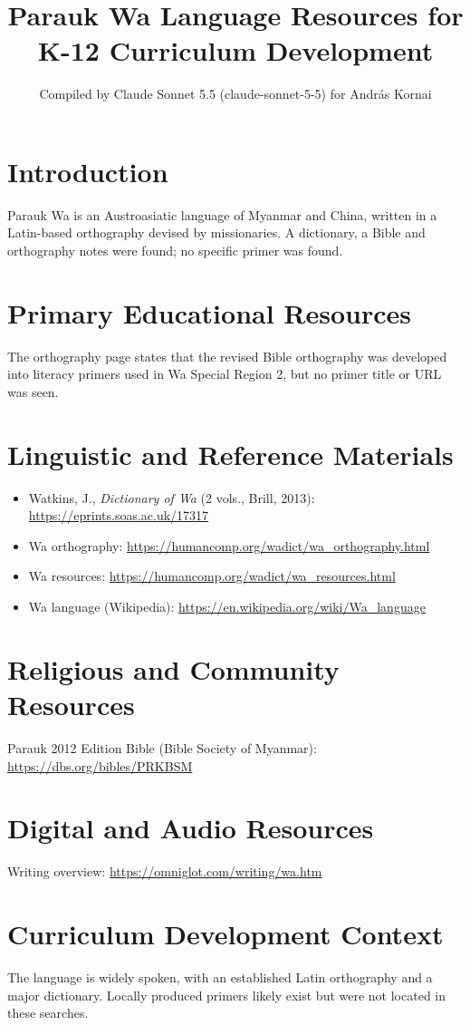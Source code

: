 \documentclass[12pt]{article}
\title{Parauk Wa Language Resources for K-12 Curriculum Development}
\author{Compiled by Claude Sonnet 5.5 (claude-sonnet-5-5) for Andr\'as Kornai}
\date{}
\begin{document}
\maketitle
\section{Introduction}
Parauk Wa is an Austroasiatic language of Myanmar and China, written in a Latin-based orthography devised by missionaries. A dictionary, a Bible and orthography notes were found; no specific primer was found.
\section{Primary Educational Resources}
The orthography page states that the revised Bible orthography was developed into literacy primers used in Wa Special Region 2, but no primer title or URL was seen.
\section{Linguistic and Reference Materials}
\begin{itemize}
\item Watkins, J., \emph{Dictionary of Wa} (2 vols., Brill, 2013): \url{https://eprints.soas.ac.uk/17317}
\item Wa orthography: \url{https://humancomp.org/wadict/wa_orthography.html}
\item Wa resources: \url{https://humancomp.org/wadict/wa_resources.html}
\item Wa language (Wikipedia): \url{https://en.wikipedia.org/wiki/Wa_language}
\end{itemize}
\section{Religious and Community Resources}
Parauk 2012 Edition Bible (Bible Society of Myanmar): \url{https://dbs.org/bibles/PRKBSM}
\section{Digital and Audio Resources}
Writing overview: \url{https://omniglot.com/writing/wa.htm}
\section{Curriculum Development Context}
The language is widely spoken, with an established Latin orthography and a major dictionary. Locally produced primers likely exist but were not located in these searches.
\end{document}
